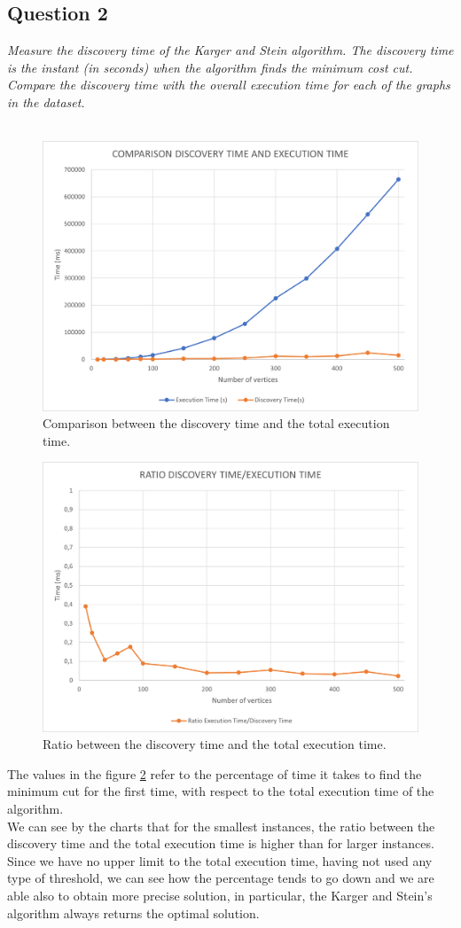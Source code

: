 \subsection{Question 2}
\textit{Measure the discovery time of the Karger and Stein algorithm. The discovery time is the instant (in seconds) when the algorithm finds the minimum cost cut. Compare the discovery time with the overall execution time for each of the graphs in the dataset.} \\ \\ \noindent
\begin{figure}[H]
    \centering
		\includegraphics[width=.73\textwidth]{./img/ComparisonExecutionDiscovery.png}
		\caption{Comparison between the discovery time and the total execution time.}
		\label{fig:comparisonExecutionDiscovery}
\end{figure}
\begin{figure}[H]
    \centering
	\includegraphics[width=.73\textwidth]{./img/RatioExecutionDiscovery.png}
	\caption{Ratio between the discovery time and the total execution time.}
	\label{fig:ratioExecutionDiscovery}
\end{figure}
\noindent
The values in the figure \ref{fig:ratioExecutionDiscovery} refer to the percentage of time it takes to find the minimum cut for the first time, with respect to the total execution time of the algorithm. \\ \noindent
We can see by the charts that for the smallest instances, the ratio between the discovery time and the total execution time is higher than for larger instances. Since we have no upper limit to the total execution time, having not used any type of threshold, we can see how the percentage tends to go down and we are able also to obtain more precise solution, in particular, the Karger and Stein's algorithm always returns the optimal solution.

